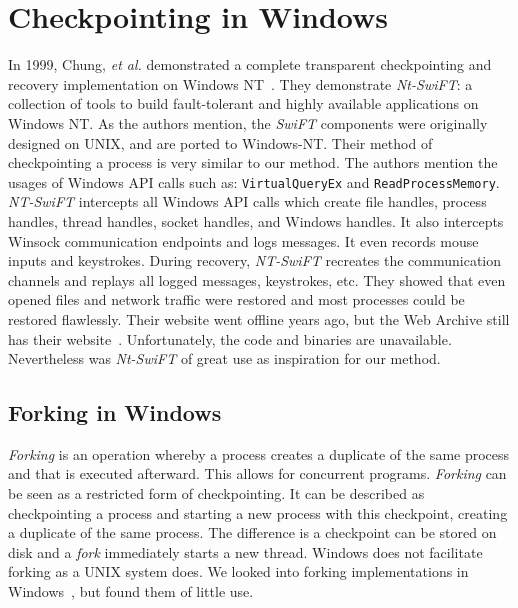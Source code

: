 \documentclass[a4paper, 11pt, english]{report}
\begin{document}
\section{Checkpointing in Windows}
\label{sec:checkpointing-in-windows}
In 1999, Chung, \textit{et al.} demonstrated a complete transparent checkpointing and recovery implementation on Windows NT~\cite{huang1998nt-swift}\cite{chung1999winckp}. They demonstrate \textit{Nt-SwiFT}: a collection of tools to build fault-tolerant and highly available applications on Windows NT. As the authors mention, the \textit{SwiFT} components were originally designed on UNIX, and are ported to Windows-NT. Their method of checkpointing a process is very similar to our method. The authors mention the usages of Windows API calls such as: \texttt{VirtualQueryEx} and \texttt{ReadProcessMemory}. \textit{NT-SwiFT} intercepts all Windows API calls which create file handles, process handles, thread handles, socket handles, and Windows handles. It also intercepts Winsock communication endpoints and logs messages. It even records mouse inputs and keystrokes. During recovery, \textit{NT-SwiFT} recreates the communication channels and replays all logged messages, keystrokes, etc.
They showed that even opened files and network traffic were restored and most processes could be restored flawlessly. Their website went offline years ago, but the Web Archive still has their website~\cite{web:winckp}. Unfortunately, the code and binaries are unavailable.
Nevertheless was \textit{Nt-SwiFT} of great use as inspiration for our method.

\subsection{Forking in Windows}
\textit{Forking} is an operation whereby a process creates a duplicate of the same process and that is executed afterward. This allows for concurrent programs. \textit{Forking} can be seen as a restricted form of checkpointing. It can be described as checkpointing a process and starting a new process with this checkpoint, creating a duplicate of the same process. The difference is a checkpoint can be stored on disk and a \textit{fork} immediately starts a new thread. Windows does not facilitate forking as a UNIX system does. We looked into forking implementations in Windows~\cite{cygwin}\cite{microsoft2016wsl}\cite{midipix}, but found them of little use.
\end{document}
